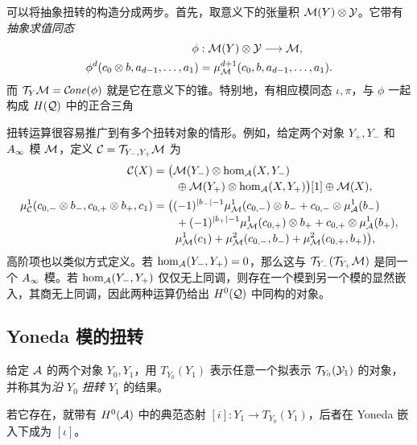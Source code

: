 可以将抽象扭转的构造分成两步。首先，取意义下的张量积 $\mathcal M(Y)\otimes\mathcal Y$。它带有\emph{抽象求值同态}
\begin{equation}\label{eq:5.2}
\begin{aligned}
\phi&:\mathcal M(Y)\otimes\mathcal Y\longrightarrow\mathcal M,\\
\phi^d(c_0\otimes b,a_{d-1},\ldots,a_1)&=\mu^{d+1}_{\mathcal M}(c_0,b,a_{d-1},\ldots,a_1).
\end{aligned}
\end{equation}
而 $\mathcal T_Y\mathcal M=\mathcal C\!\mathit{one}(\phi)$ 就是它在意义下的锥。特别地，有相应模同态 $\iota,\pi$，与 $\phi$ 一起构成
$H(\mathcal Q)$ 中的正合三角
\begin{note}\label{st:5.1}
扭转运算很容易推广到有多个扭转对象的情形。例如，给定两个对象 $Y_+,Y_-$ 和 $A_\infty$ 模 $\mathcal M$，定义 $\mathcal C=\mathcal T_{Y_-,Y_+}\mathcal M$ 为
\[
\begin{aligned}
\mathcal C(X)&=\bigl(\mathcal M(Y_-)\otimes\hom_{\mathcal A}(X,Y_-)\\[-2pt]
&\qquad\oplus\mathcal M(Y_+)\otimes\hom_{\mathcal A}(X,Y_+)\bigr)[1]\oplus\mathcal M(X),\\
\mu^1_{\mathcal C}(c_{0,-}\otimes b_-,c_{0,+}\otimes b_+,c_1)
&=\bigl((-1)^{|b_-|-1}\mu^1_{\mathcal M}(c_{0,-})\otimes b_-+c_{0,-}\otimes\mu^1_{\mathcal A}(b_-)\\[-2pt]
&\qquad+(-1)^{|b_+|-1}\mu^1_{\mathcal M}(c_{0,+})\otimes b_++c_{0,+}\otimes\mu^1_{\mathcal A}(b_+),\\[-2pt]
&\qquad\mu^1_{\mathcal M}(c_1)+\mu^2_{\mathcal M}(c_{0,-},b_-)+\mu^2_{\mathcal M}(c_{0,+},b_+)\bigr),
\end{aligned}
\]
高阶项也以类似方式定义。若 $\hom_{\mathcal A}(Y_-,Y_+)=0$，那么这与 $\mathcal T_{Y_-}(\mathcal T_{Y_+}\mathcal M)$ 是同一个 $A_\infty$ 模。若 $\hom_{\mathcal A}(Y_-,Y_+)$ 仅仅无上同调，则存在一个模到另一个模的显然嵌入，其商无上同调，因此两种运算仍给出 $H^0(\mathcal Q)$ 中同构的对象。
\end{note}

\subsection{Yoneda 模的扭转}\label{sec:5b}
\begin{definition*}
给定 $\mathcal A$ 的两个对象 $Y_0,Y_1$，用 $T_{Y_0}(Y_1)$ 表示任意一个拟表示 $\mathcal T_{Y_0}(\mathcal Y_1)$ 的对象，并称其为\emph{沿 $Y_0$ 扭转 $Y_1$} 的结果。
\end{definition*}
若它存在，就带有 $H^0(\mathcal A)$ 中的典范态射 $[i]:Y_1\to T_{Y_0}(Y_1)$，后者在 Yoneda 嵌入下成为 $[\iota]$。

